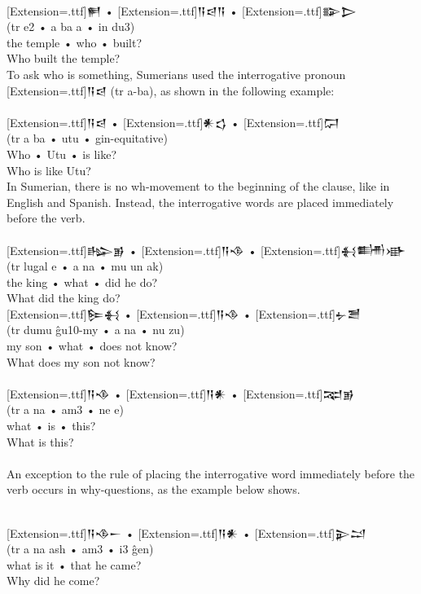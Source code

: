 \documentclass[a4paper,12pt]{book}
\newcommand{\fcn}{\setmainfont{Akkadian}[Extension=.ttf]}
\newcommand{\fsm}{\Large\setmainfont{Akkadian}[Extension=.ttf]}
\begin{document}
\verb||\\
{\fsm 𒂍} •  {\fsm 𒀀𒁀𒀀} •  {\fsm 𒅔𒆕}\\
(tr e2 •  a ba a •  in du3)\\
the temple • who • built?\\
Who built the temple?\\

To ask who is something, Sumerians used the
interrogative pronoun {\fcn 𒀀𒁀} (tr a-ba),
as shown in the following example:\\

\verb||\\
{\fsm 𒀀𒁀} • {\fsm 𒀭𒌓} • {\fsm 𒁶}\\
(tr a ba • utu • gin-equitative)\\
Who • Utu • is like?\\
Who is like Utu?\\

In Sumerian, there is no wh-movement
to the beginning of the clause, like
in English and Spanish. Instead, the
interrogative words are placed immediately
before the verb.\\

\verb||\\
{\fsm 𒈗𒂊} • {\fsm 𒀀𒈾} • {\fsm 𒈬𒌦𒀝}\\
(tr lugal e • a na •  mu un ak)\\
the king • what • did he do?\\
What did the king do?\\

\newpage
\noindent
{\fsm 𒌉𒈬} • {\fsm 𒀀𒈾} • {\fsm 𒉡𒍪}\\
(tr dumu ĝu10-my • a na • nu zu)\\
my son • what • does not know?\\
What does my son not know?\\

\verb||\\
{\fsm 𒀀𒈾} • {\fsm 𒀀𒀭} • {\fsm 𒉈𒂊}\\
(tr a na • am3 • ne e)\\
what • is • this? \\
What is this?\\

\verb||\\
An exception to the rule of placing the
interrogative word immediately before
the verb occurs in why-questions,
as the example below shows.

\verb||\\
{\fsm 𒀀𒈾𒀸} • {\fsm 𒀀𒀭} • {\fsm 𒉌𒁺}\\
(tr a na ash • am3 • i3 ĝen)\\
what is it • that he came?\\
Why did he come?\\
\end{document}
